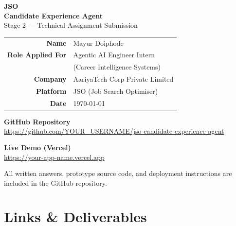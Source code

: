 \documentclass[11pt, a4paper]{article}
\begin{document}
\begin{titlepage}
\centering
\vspace*{3cm}

{\Huge\bfseries\color{jso} JSO}\\[6pt]
{\LARGE\bfseries\color{darkblue} Candidate Experience Agent}\\[20pt]
{\large Stage 2 — Technical Assignment Submission}

\vspace{2cm}

\begin{tabular}{r l}
\textbf{Name} & Mayur Doiphode \\
\textbf{Role Applied For} & Agentic AI Engineer Intern \\
 & (Career Intelligence Systems) \\
\textbf{Company} & AariyaTech Corp Private Limited \\
\textbf{Platform} & JSO (Job Search Optimiser) \\
\textbf{Date} & \today \\
\end{tabular}

\vspace{2cm}

\begin{tcolorbox}[colback=jso!5, colframe=jso, boxrule=1pt, arc=4pt, width=0.85\textwidth]
\centering
\textbf{GitHub Repository}\\[4pt]
\url{https://github.com/YOUR_USERNAME/jso-candidate-experience-agent}

\vspace{10pt}

\textbf{Live Demo (Vercel)}\\[4pt]
\url{https://your-app-name.vercel.app}
\end{tcolorbox}

\vfill
{\small\color{grey} All written answers, prototype source code, and deployment instructions are included in the GitHub repository.}
\end{titlepage}

\tableofcontents
\newpage

\section*{Links \& Deliverables}
\end{document}
